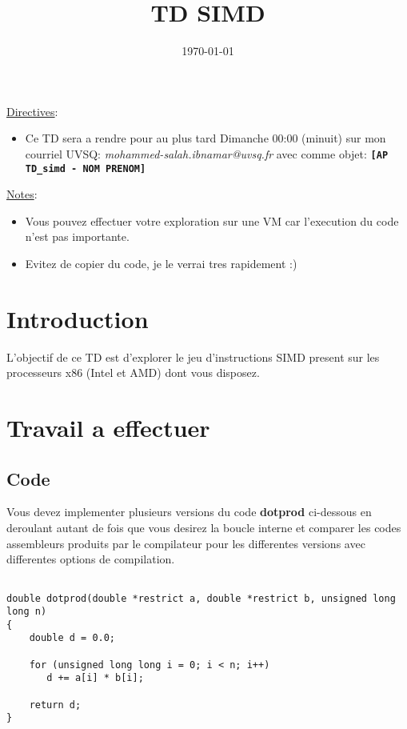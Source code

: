\documentclass[11pt]{article}
\date{\today}
\title{TD SIMD}
\begin{document}
\maketitle
\tableofcontents

\uline{Directives}:

\begin{itemize}
\item Ce TD sera a rendre pour au plus tard Dimanche 00:00 (minuit) sur mon courriel UVSQ: \emph{mohammed-salah.ibnamar@uvsq.fr} avec comme objet: \textbf{\texttt{[AP TD\_simd - NOM PRENOM]}}
\end{itemize}

\uline{Notes}:

\begin{itemize}
\item Vous pouvez effectuer votre exploration sur une VM car l'execution du code n'est pas importante.
\item Evitez de copier du code, je le verrai tres rapidement :)
\end{itemize}

\section{Introduction}
\label{sec:orgad478f1}

L'objectif de ce TD est d'explorer le jeu d'instructions SIMD present 
sur les processeurs x86 (Intel et AMD) dont vous disposez.

\section{Travail a effectuer}
\label{sec:org1a77e54}
\subsection{Code}
\label{sec:org763d1f1}

Vous devez implementer plusieurs versions du code \textbf{dotprod} ci-dessous en deroulant autant de fois 
que vous desirez la boucle interne et comparer les codes assembleurs produits par le compilateur 
pour les differentes versions avec differentes options de compilation.

\begin{verbatim}

double dotprod(double *restrict a, double *restrict b, unsigned long long n)
{
    double d = 0.0;

    for (unsigned long long i = 0; i < n; i++)
       d += a[i] * b[i];

    return d;
}

\end{verbatim}
\end{document}
